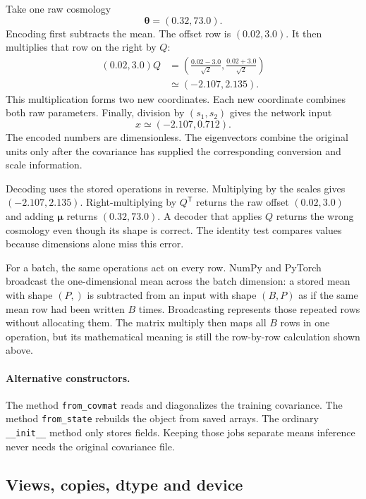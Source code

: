 \documentclass[10pt,aps,prd,twocolumn,nofootinbib]{revtex4-2}
\newcommand{\code}[1]{\texttt{#1}}
\begin{document}
Take one raw cosmology
\begin{equation*}
  \boldsymbol\theta=(0.32,73.0).
\end{equation*}
Encoding first subtracts the mean.  The offset row is
$(0.02,3.0)$.  It then multiplies that row on the right by $Q$:
\begin{align*}
 (0.02,3.0)Q
 &=\left(\frac{0.02-3.0}{\sqrt{2}},
          \frac{0.02+3.0}{\sqrt{2}}\right)\\
 &\simeq(-2.107,2.135).
\end{align*}
This multiplication forms two new coordinates.  Each new coordinate combines
both raw parameters.  Finally, division by
$(s_1,s_2)$ gives the network input
\begin{equation*}
  x\simeq(-2.107,0.712).
\end{equation*}
The encoded numbers are dimensionless.  The eigenvectors combine the original
units only after the covariance has supplied the corresponding conversion and
scale information.

Decoding uses the stored operations in reverse.  Multiplying by the scales
gives $(-2.107,2.135)$.  Right-multiplying by $Q^{\mathsf T}$ returns the raw
offset $(0.02,3.0)$ and adding $\boldsymbol\mu$ returns $(0.32,73.0)$.  A
decoder that applies $Q$ returns the wrong cosmology even though its shape is
correct.  The identity test compares values because
dimensions alone miss this error.

For a batch, the same operations act on every row.  NumPy and PyTorch
broadcast the one-dimensional mean across the batch dimension: a stored
mean with shape $(P,)$ is subtracted from an input with shape $(B,P)$ as if
the same mean row had been written $B$ times.  Broadcasting represents those
repeated rows without allocating them.  The matrix multiply then maps all $B$ rows in one
operation, but its mathematical meaning is still the row-by-row calculation
shown above.

\paragraph{Alternative constructors.}
The method \code{from\_covmat} reads and diagonalizes the training
covariance.  The method \code{from\_state} rebuilds the object from saved
arrays.  The ordinary \code{\_\_init\_\_} method only stores fields.  Keeping
those jobs separate means inference never needs the original covariance file.

\subsection{Views, copies, dtype and device}
\end{document}
